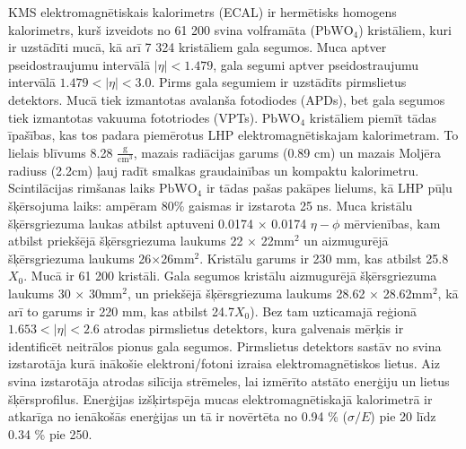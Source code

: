 KMS elektromagnētiskais kalorimetrs (ECAL) ir hermētisks homogens kalorimetrs, kurš izveidots no 61 200 svina volframāta ($\text{PbWO}_{4}$) kristāliem, kuri ir uzstādīti mucā, kā arī 7 324 kristāliem gala segumos. Muca aptver pseido\gls{straujumu} intervālā $\left|\eta\right|<1.479$, gala segumi aptver pseidostraujumu intervālā $1.479<\left|\eta\right|<3.0$. Pirms gala segumiem ir uzstādīts pirmslietus detektors. Mucā tiek izmantotas avalanša fotodiodes (APDs), bet gala segumos tiek izmantotas vakuuma fototriodes (VPTs). $\text{PbWO}_{4}$ kristāliem piemīt tādas īpašības, kas tos padara piemērotus LHP elektromagnētiskajam kalorimetram. To lielais blīvums 8.28 $\frac{\text{g}}{\text{cm}^3}$, mazais radiācijas garums (0.89 cm)  un mazais Moljēra radiuss (2.2cm) ļauj radīt smalkas graudainības un kompaktu kalorimetru. Scintilācijas rimšanas laiks $\text{PbWO}_{4}$ ir tādas pašas pakāpes lielums, kā LHP pūļu šķērsojuma laiks: ampēram 80\% gaismas ir izstarota 25 ns. Muca kristālu šķērsgriezuma laukas atbilst aptuveni 0.0174 $\times$ 0.0174 $\eta - \phi$ mērvienības, kam atbilst priekšējā šķērsgriezuma laukums 22 $\times$ 22$\text{mm}^2$ un aizmugurējā šķērsgriezuma laukums 26$\times$26$\text{mm}^2$. Kristālu garums ir 230 mm, kas atbilst 25.8 $X_{0}$. Mucā ir 61 200 kristāli. Gala segumos kristālu aizmugurējā šķērsgriezuma laukums 30 $\times$ 30$\text{mm}^2$,  un priekšējā šķērsgriezuma laukums 28.62 $\times$ 28.62$\text{mm}^2$, kā arī to garums ir 220 mm, kas atbilst 24.7$X_{0}$). Bez tam uzticamajā reģionā $1.653 < \left|\eta\right| <2.6$ atrodas pirmslietus detektors, kura galvenais mērķis ir identificēt neitrālos pionus gala segumos. Pirmslietus detektors sastāv no svina izstarotāja kurā inākošie elektroni/fotoni izraisa elektromagnētiskos lietus. Aiz svina izstarotāja atrodas silīcija strēmeles, lai izmērīto atstāto enerģiju un lietus šķērsprofilus. Enerģijas izšķirtspēja mucas elektromagnētiskajā kalorimetrā ir atkarīga no ienākošās enerģijas un tā ir novērtēta no 0.94 \% ($\sigma/E$) pie 20 \GeV līdz 0.34 \% pie 250\GeV \cite{Adzic:2007mi}. 

